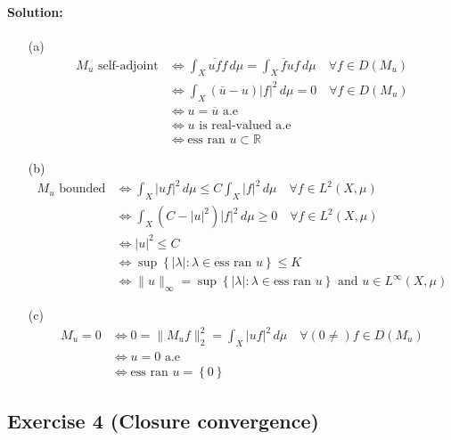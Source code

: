 \paragraph{Solution:}
\begin{itemize}
	\item [(a)]
		\begin{equation*}
			\begin{aligned}
				M_{u}\text{ self-adjoint} &\iff \int_{X}\overline{uf}f\,d\mu = \int_{X}\overline{f}uf\,d\mu \quad \forall f\in D(M_{u})\\
				&\iff \int_{X}(\overline{u}-u)|f|^{2}\,d\mu = 0 \quad \forall f\in D(M_{u})\\
				&\iff u = \overline{u}\text{ a.e}\\
				&\iff u \text{ is real-valued a.e}\\
				&\iff \text{ess ran }u\subset\mathbb{R}
			\end{aligned}
		\end{equation*}
	\item [(b)]
		\begin{equation*}
			\begin{aligned}
				M_{u} \text{ bounded} &\iff \int_{X}|uf|^{2}\,d\mu \leq C\int_{X}|f|^{2}\,d\mu \quad \forall f\in L^{2}(X,\mu)\\
				&\iff \int_{X}(C-|u|^{2})|f|^{2}\,d\mu\geq 0 \quad \forall f\in L^{2}(X,\mu)\\
				&\iff |u|^{2}\leq C\\
				&\iff \sup\left\{|\lambda|\colon \lambda\in\text{ess ran }u\right\}\leq K\\
				&\iff \|u\|_{\infty} = \sup\left\{|\lambda|\colon \lambda\in\text{ess ran }u\right\}\text{ and }u\in L^{\infty}(X,\mu)
			\end{aligned}
		\end{equation*}
	\item [(c)]
		\begin{equation*}
			\begin{aligned}
				M_{u}=0 &\iff 0 = \|M_{u}f\|_{2}^{2} = \int_{X}|uf|^{2}\,d\mu \quad \forall (0\neq)f\in D(M_{u})\\
				&\iff u = 0 \text{ a.e}\\
				&\iff \text{ess ran }u = \left\{0\right\}
			\end{aligned}
		\end{equation*}
\end{itemize}

\subsection{Exercise 4 (Closure convergence)}

